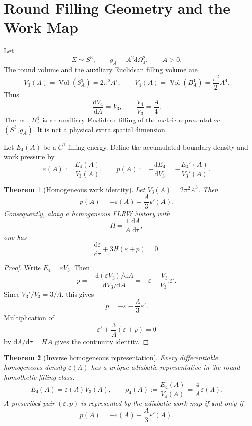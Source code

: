 \documentclass[aps,prd,reprint,onecolumn,nofootinbib,superscriptaddress,showkeys]{revtex4-2}
\numberwithin{equation}{section}
\theoremstyle{definition}
\theoremstyle{plain}
\newtheorem{theorem}{Theorem}[section]
\newcommand{\Sthree}{S^3}
\newcommand{\Bfour}{B^4}
\newcommand{\dd}{\mathrm d}
\newcommand{\vol}{\operatorname{Vol}}
\begin{document}
\section{Round Filling Geometry and the Work Map}

Let
\begin{equation}
\Sigma\simeq \Sthree,
\qquad
g_A=A^2\dd\Omega_3^2,
\qquad
A>0.
\end{equation}
The round volume and the auxiliary Euclidean filling volume are
\begin{equation}
V_3(A)=\vol(\Sthree_A)=2\pi^2A^3,
\qquad
V_4(A)=\vol(\Bfour_A)=\frac{\pi^2}{2}A^4.
\end{equation}
Thus
\begin{equation}
\frac{\dd V_4}{\dd A}=V_3,
\qquad
\frac{V_4}{V_3}=\frac A4.
\end{equation}
The ball \(\Bfour_A\) is an auxiliary Euclidean filling of the metric representative \((\Sthree,g_A)\).  It is not a physical extra spatial dimension.

Let \(E_4(A)\) be a \(C^1\) filling energy.  Define the accumulated boundary density and work pressure by
\begin{equation}
\varepsilon(A):=\frac{E_4(A)}{V_3(A)},
\qquad
p(A):=-\frac{\dd E_4}{\dd V_3}
=-\frac{E_4'(A)}{V_3'(A)}.
\end{equation}

\begin{theorem}[Homogeneous work identity]
Let \(V_3(A)=2\pi^2A^3\).  Then
\begin{equation}
p(A)=-\varepsilon(A)-\frac A3\varepsilon'(A).
\end{equation}
Consequently, along a homogeneous FLRW history with
\[
H=\frac1A\frac{\dd A}{\dd\tau},
\]
one has
\begin{equation}
\frac{\dd\varepsilon}{\dd\tau}+3H(\varepsilon+p)=0.
\end{equation}
\end{theorem}

\begin{proof}
Write \(E_4=\varepsilon V_3\).  Then
\[
p=-\frac{\dd(\varepsilon V_3)/\dd A}{\dd V_3/\dd A}
=-\varepsilon-\frac{V_3}{V_3'}\varepsilon'.
\]
Since \(V_3'/V_3=3/A\), this gives
\[
p=-\varepsilon-\frac A3\varepsilon'.
\]
Multiplication of
\[
\varepsilon'+\frac3A(\varepsilon+p)=0
\]
by \(\dd A/\dd\tau=HA\) gives the continuity identity.
\end{proof}

\begin{theorem}[Inverse homogeneous representation]
Every differentiable homogeneous density \(\varepsilon(A)\) has a unique adiabatic representative in the round homothetic filling class:
\begin{equation}
E_4(A)=\varepsilon(A)V_3(A),
\qquad
\rho_4(A):=\frac{E_4(A)}{V_4(A)}
=\frac4A\varepsilon(A).
\end{equation}
A prescribed pair \((\varepsilon,p)\) is represented by the adiabatic work map if and only if
\begin{equation}
p(A)=-\varepsilon(A)-\frac A3\varepsilon'(A).
\end{equation}
\end{theorem}
\end{document}
